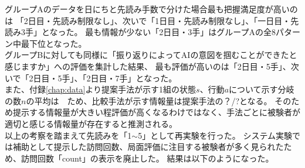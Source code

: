グループAのデータを日にちと先読み手数で分けた場合最も把握満足度が高いのは
「2日目・先読み制限なし」、次いで「1日目・先読み制限なし」、「一日目・先読み3手」となった。
最も情報が少ない「2日目・3手」はグループAの全8パターン中最下位となった。\\


グループBに対しても同様に「振り返りによってAIの意図を掴むことができたと感じますか」への評価を集計した結果、
最も評価が高いのは「2日目・5手」、次いで「2日目・5手」、「2日目・7手」となった。\\



また、付録\ref{chap:data}より提案手法が示す1組の状態$s$、行動$a$について示す分岐の数$n$の平均は　ため、比較手法が示す情報量は提案手法の？/?となる。
そのため提示する情報量が大きい程評価が高くなるわけではなく、手法ごとに被験者が適切と感じる情報量が存在すると推測される。\\

以上の考察を踏まえて先読みを「1$\sim$5」として再実験を行った。
システム実験では補助として提示した訪問回数、局面評価に注目する被験者が多く見られたため、訪問回数「count」の表示を廃止した。
結果は以下のようになった。


